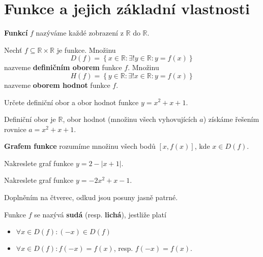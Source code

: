 \section{Funkce a jejich základní vlastnosti}
\begin{definition}
  \textbf{Funkcí} $f$ nazýváme každé zobrazení z $\mathbb R$ do $\mathbb R$.
\end{definition}

\begin{definition}
  Nechť $f\subseteq \mathbb R \times \mathbb R$ je funkce. Množinu
  \[
    D(f) = \left  \{ x \in \mathbb R:\exists ! y \in \mathbb R:y=f(x) \right \}
  \]
  nazveme \textbf{definičním oborem} funkce $f$. Množinu
  \[
    H(f) = \left  \{ y \in \mathbb R:\exists ! x \in \mathbb R:y=f(x) \right \}
  \]
  nazveme \textbf{oborem hodnot} funkce $f$.
\end{definition}

\begin{priklad}
Určete definiční obor a obor hodnot funkce $y=x^2+x+1.$
\end{priklad}

\begin{reseni}
Definiční obor je $\mathbb R$, obor hodnot (množinu všech vyhovujících $a$)
získáme řešením rovnice $a=x^2+x+1.$
\end{reseni}

\begin{pozn}
  \textbf{Grafem funkce} rozumíme množinu všech bodů $[x,f(x)]$, kde $x\in D(f).$
\end{pozn}

\begin{priklad}
Nakreslete graf funkce $y=2-|x+1|.$
\end{priklad}

\begin{priklad}
Nakreslete graf funkce $y=-2x^2+x-1$.
\end{priklad}

\begin{reseni}
Doplněním na čtverec, odkud jsou posuny jasně patrné.
\end{reseni}

\begin{definition}
  Funkce $f$ se nazývá \textbf{sudá} (resp. \textbf{lichá}), jestliže platí
\begin{itemize}
  \item
  $\forall x \in D(f):(-x) \in D(f)$
\item
 $\forall x \in D(f): f(-x)=f(x)$, resp. $f(-x)=f(x)$.
\end{itemize}

\end{definition}


